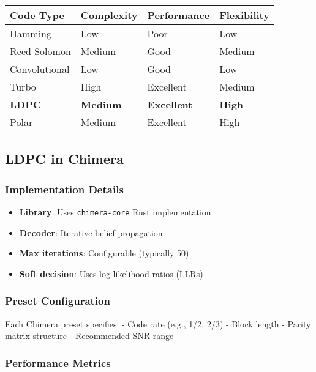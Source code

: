{\def\LTcaptype{} %
\begin{longtable}[]{@{}llll@{}}
\toprule\noalign{}
Code Type & Complexity & Performance & Flexibility \\
\midrule\noalign{}
\endhead
\bottomrule\noalign{}
\endlastfoot
Hamming & Low & Poor & Low \\
Reed-Solomon & Medium & Good & Medium \\
Convolutional & Low & Good & Low \\
Turbo & High & Excellent & Medium \\
\textbf{LDPC} & \textbf{Medium} & \textbf{Excellent} & \textbf{High} \\
Polar & Medium & Excellent & High \\
\end{longtable}
}

\subsection{LDPC in Chimera}\label{ldpc-in-chimera}

\subsubsection{Implementation Details}\label{implementation-details}

\begin{itemize}
\tightlist
\item
  \textbf{Library}: Uses \texttt{chimera-core} Rust implementation
\item
  \textbf{Decoder}: Iterative belief propagation
\item
  \textbf{Max iterations}: Configurable (typically 50)
\item
  \textbf{Soft decision}: Uses log-likelihood ratios (LLRs)
\end{itemize}

\subsubsection{Preset Configuration}\label{preset-configuration}

Each Chimera preset specifies: - Code rate (e.g., 1/2, 2/3) - Block
length - Parity matrix structure - Recommended SNR range

\subsubsection{Performance Metrics}\label{performance-metrics}

